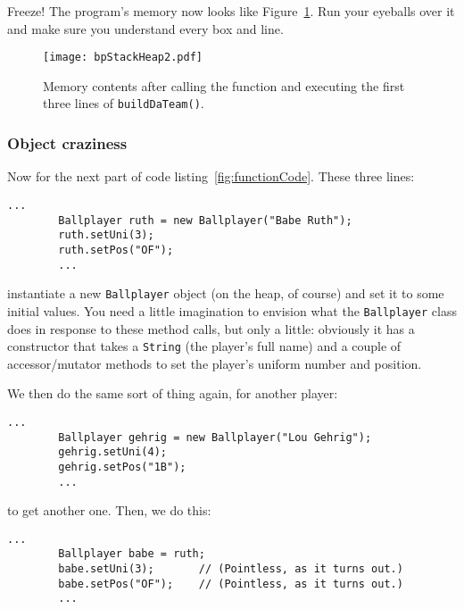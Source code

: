 Freeze! The program's memory now looks like Figure~\ref{fig:bpStackHeap2}.
Run your eyeballs over it and make sure you understand every box and line.

\begin{figure}   %
\centering
\texttt{[image: bpStackHeap2.pdf]}
\caption{Memory contents after calling the function and executing the first
three lines of \texttt{buildDaTeam()}.}
\label{fig:bpStackHeap2}
\end{figure}

\subsubsection{Object craziness}

Now for the next part of code listing~\ref{fig:functionCode}. These three
lines:

\begin{Verbatim}[fontsize=\scriptsize,samepage=true,frame=single]
        ...
        Ballplayer ruth = new Ballplayer("Babe Ruth");
        ruth.setUni(3);
        ruth.setPos("OF");
        ...
\end{Verbatim}

instantiate a new \texttt{Ballplayer} object (on the heap, of course) and set
it to some initial values. You need a little imagination to envision what the
\texttt{Ballplayer} class does in response to these method calls, but only a
little: obviously it has a constructor that takes a \texttt{String} (the
player's full name) and a couple of accessor/mutator methods to set the
player's uniform number and position. 

We then do the same sort of thing again, for another player:

\begin{Verbatim}[fontsize=\scriptsize,samepage=true,frame=single]
        ...
        Ballplayer gehrig = new Ballplayer("Lou Gehrig");
        gehrig.setUni(4);
        gehrig.setPos("1B");
        ...
\end{Verbatim}

to get another one. Then, we do this:

\begin{Verbatim}[fontsize=\scriptsize,samepage=true,frame=single]
        ...
        Ballplayer babe = ruth;
        babe.setUni(3);       // (Pointless, as it turns out.)
        babe.setPos("OF");    // (Pointless, as it turns out.)
        ...
\end{Verbatim}

